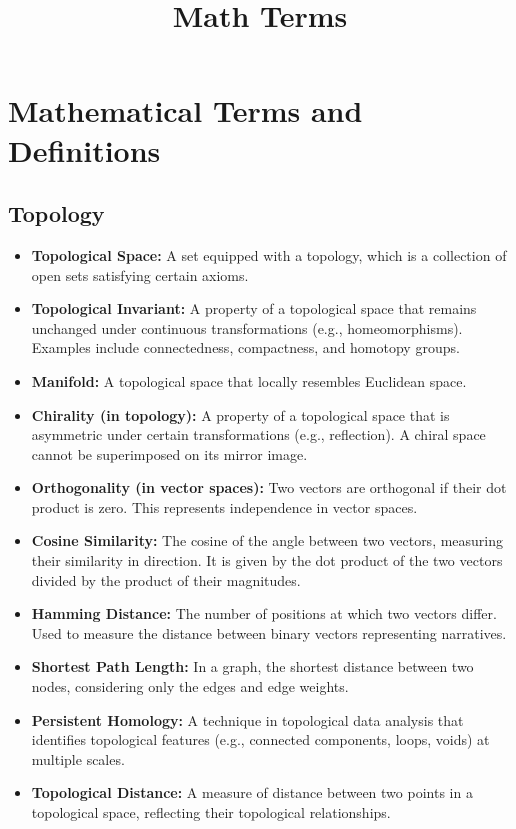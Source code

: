 \documentclass{article}
\title{Math Terms}
\date{}
\begin{document}
\maketitle

\section{Mathematical Terms and Definitions}

\subsection{Topology}

\begin{itemize}
    \item \textbf{Topological Space:} A set equipped with a topology, which is a collection of open sets satisfying certain axioms.
    \item \textbf{Topological Invariant:} A property of a topological space that remains unchanged under continuous transformations (e.g., homeomorphisms). Examples include connectedness, compactness, and homotopy groups.
    \item \textbf{Manifold:} A topological space that locally resembles Euclidean space.
    \item \textbf{Chirality (in topology): } A property of a topological space that is asymmetric under certain transformations (e.g., reflection).  A chiral space cannot be superimposed on its mirror image.
    \item \textbf{Orthogonality (in vector spaces): } Two vectors are orthogonal if their dot product is zero. This represents independence in vector spaces.
    \item \textbf{Cosine Similarity:} The cosine of the angle between two vectors, measuring their similarity in direction. It is given by the dot product of the two vectors divided by the product of their magnitudes.
    \item \textbf{Hamming Distance:} The number of positions at which two vectors differ. Used to measure the distance between binary vectors representing narratives.
    \item \textbf{Shortest Path Length:} In a graph, the shortest distance between two nodes, considering only the edges and edge weights.
    \item \textbf{Persistent Homology:} A technique in topological data analysis that identifies topological features (e.g., connected components, loops, voids) at multiple scales.
    \item \textbf{Topological Distance:} A measure of distance between two points in a topological space, reflecting their topological relationships.
\end{itemize}
\end{document}
